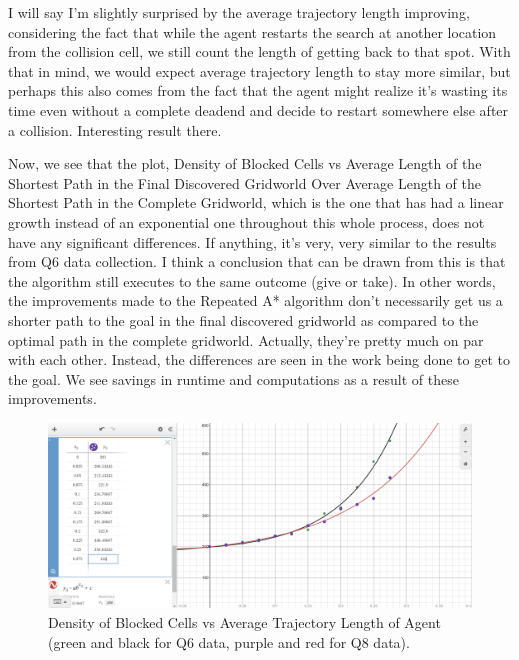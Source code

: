 \documentclass{homeworg}
\begin{document}
I will say I'm slightly surprised by the average trajectory length improving, considering the fact that while the agent restarts the search at another location from the collision cell, we still count the length of getting back to that spot. With that in mind, we would expect average trajectory length to stay more similar, but perhaps this also comes from the fact that the agent might realize it's wasting its time even without a complete deadend and decide to restart somewhere else after a collision. Interesting result there.

Now, we see that the plot, Density of Blocked Cells vs Average Length of the Shortest Path in the Final Discovered Gridworld Over Average Length of the Shortest Path in the Complete Gridworld, which is the one that has had a linear growth instead of an exponential one throughout this whole process, does not have any significant differences. If anything, it's very, very similar to the results from Q6 data collection. I think a conclusion that can be drawn from this is that the algorithm still executes to the same outcome (give or take). In other words, the improvements made to the Repeated A* algorithm don't necessarily get us a shorter path to the goal in the final discovered gridworld as compared to the optimal path in the complete gridworld. Actually, they're pretty much on par with each other. Instead, the differences are seen in the work being done to get to the goal. We see savings in runtime and computations as a result of these improvements.



\begin{figure}[h]
  	\centering
  	\includegraphics*[scale=0.3]{Q8 Density vs Avg Trajectory Length.png}
	\caption{Density of Blocked Cells vs Average Trajectory Length of Agent (green and black for Q6 data, purple and red for Q8 data).}
	\label{fig:example}
\end{figure}
\end{document}
